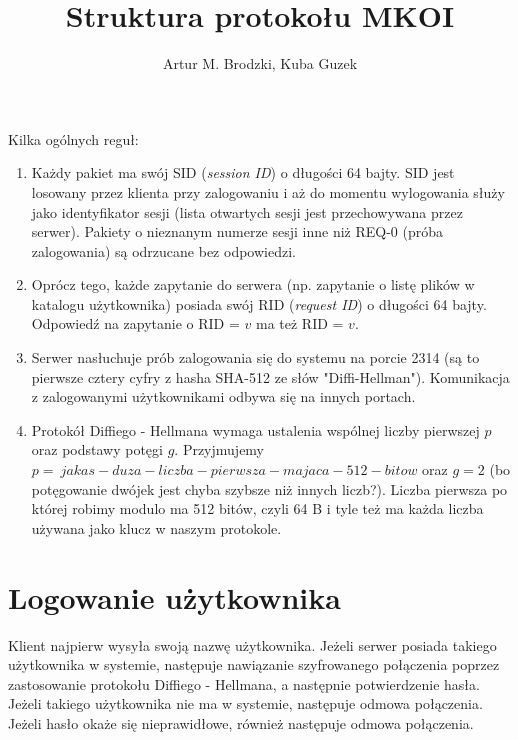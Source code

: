 \documentclass{article}
\author{Artur M. Brodzki, Kuba Guzek}
\title{Struktura protokołu MKOI}
\begin{document}
	\maketitle
	
	Kilka ogólnych reguł:
	\begin{enumerate}
		\item Każdy pakiet ma swój SID (\emph{session ID}) o długości 64 bajty. SID jest losowany przez klienta przy zalogowaniu i aż do momentu wylogowania służy jako identyfikator sesji (lista otwartych sesji jest przechowywana przez serwer). Pakiety o nieznanym numerze sesji inne niż REQ-0 (próba zalogowania) są odrzucane bez odpowiedzi. 
		\item Oprócz tego, każde zapytanie do serwera (np. zapytanie o listę plików w katalogu użytkownika) posiada swój RID (\emph{request ID}) o długości 64 bajty. Odpowiedź na zapytanie o RID = $v$ ma też RID = $v$. 
		\item Serwer nasłuchuje prób zalogowania się do systemu na porcie 2314 (są to pierwsze cztery cyfry z hasha SHA-512 ze słów "Diffi-Hellman"). Komunikacja z zalogowanymi użytkownikami odbywa się na innych portach. 
		\item Protokół Diffiego - Hellmana wymaga ustalenia wspólnej liczby pierwszej $p$ oraz podstawy potęgi $g$. Przyjmujemy $p=\ jakas-duza-liczba-pierwsza-majaca-512-bitow$ oraz $g=2$ (bo potęgowanie dwójek jest chyba szybsze niż innych liczb?). Liczba pierwsza po której robimy modulo ma 512 bitów, czyli 64 B i tyle też ma każda liczba używana jako klucz w naszym protokole. 
	\end{enumerate}
	
	\section{Logowanie użytkownika}
	Klient najpierw wysyła swoją nazwę użytkownika. Jeżeli serwer posiada takiego użytkownika w systemie, następuje nawiązanie szyfrowanego połączenia poprzez zastosowanie protokołu Diffiego - Hellmana, a następnie potwierdzenie hasła. Jeżeli takiego użytkownika nie ma w systemie, następuje odmowa połączenia. Jeżeli hasło okaże się nieprawidłowe, również następuje odmowa połączenia. 
	
\end{document}
